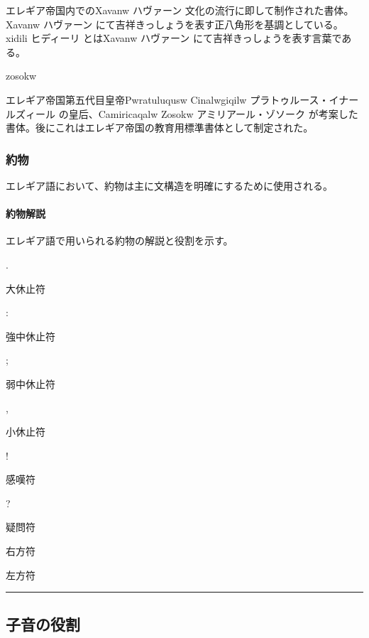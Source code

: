 \documentclass[
  japanese,
]{article}
\begin{document}
\begin{description}
エレギア帝国内での{Xavanw} ハヴァーン
文化の流行に即して制作された書体。{Xavanw} ハヴァーン
にて吉祥きっしょうを表す正八角形を基調としている。{xidili} ヒディーリ
とは{Xavanw} ハヴァーン にて吉祥きっしょうを表す言葉である。
\item[ゾソーク体]
zosokw

エレギア帝国第五代目皇帝{Pwratuluqusw Cinalwgiqilw}
プラトゥルース・イナールズィール の皇后、{Camiricaqalw Zosokw}
アミリアール・ゾソーク
が考案した書体。後にこれはエレギア帝国の教育用標準書体として制定された。
\end{description}

\subsubsection{約物}\label{section3.3}

エレギア語において、約物は主に文構造を明確にするために使用される。

\paragraph{約物解説}\label{subsection3.3.1}

エレギア語で用いられる約物の解説と役割を示す。

{.}

大休止符

{:}

強中休止符

{;}

弱中休止符

{,}

小休止符

{!}

感嘆符

{?}

疑問符

\begin{figure}
\centering
\caption{}
\end{figure}

右方符

\begin{figure}
\centering
\caption{}
\end{figure}

左方符

\begin{center}\rule{0.5\linewidth}{0.5pt}\end{center}

\subsection{子音の役割}\label{chapter4}
\end{document}
